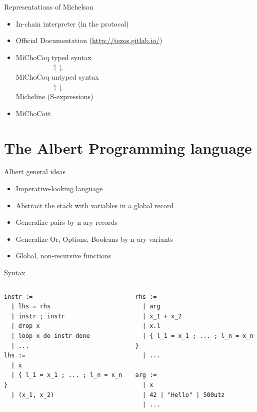 \documentclass[aspectratio=169]{beamer}
\begin{document}
\begin{frame}{Representations of Michelson}
  \begin{itemize}
    \item In-chain interpreter (in the protocol)
    \item Official Documentation (\url{http://tezos.gitlab.io/})
    \item MiChoCoq typed syntax\\
      $\mspace{90mu}\upharpoonleft \downharpoonright$ \\
      MiChoCoq untyped syntax \\
      $\mspace{90mu}\upharpoonleft \downharpoonright$ \\
      Micheline (S-expressions)
    \item MiChoCott
  \end{itemize}
\end{frame}

\section{The Albert Programming language}

\begin{frame}{Albert general ideas}
  \begin{itemize}
    \item Imperative-looking language
    \item Abstract the stack with variables in a global record
    \item Generalize pairs by n-ary records
    \item Generalize Or, Options, Booleans by n-ary variants
    \item Global, non-recursive functions
  \end{itemize}
\end{frame}

\begin{frame}[fragile]{Syntax}
  \begin{columns}
    \begin{column}{.5\linewidth}
\begin{verbatim}
instr :=
  | lhs = rhs
  | instr ; instr
  | drop x
  | loop x do instr done
  | ...
lhs :=
  | x
  | { l_1 = x_1 ; ... ; l_n = x_n }
  | (x_1, x_2)
\end{verbatim}
    \end{column}
    \begin{column}{.5\linewidth}
\begin{verbatim}
rhs :=
  | arg
  | x_1 + x_2
  | x.l
  | { l_1 = x_1 ; ... ; l_n = x_n }
  | ...

arg :=
  | x
  | 42 | "Hello" | 500utz
  | ...
\end{verbatim}
    \end{column}
  \end{columns}
\end{frame}
\end{document}

